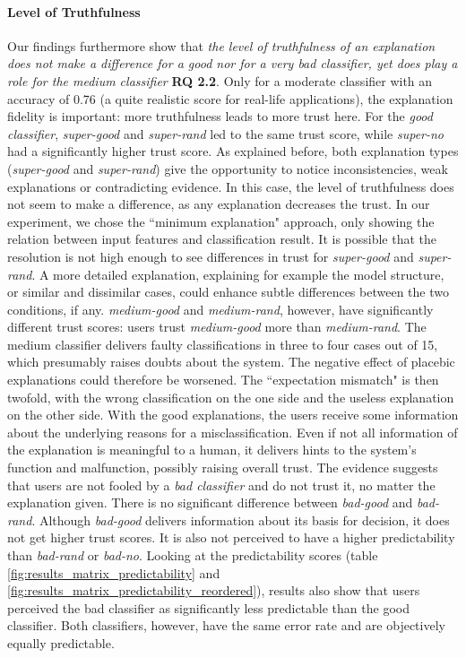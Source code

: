 \paragraph{Level of Truthfulness} 
Our findings furthermore show that \textit{the level of truthfulness of an explanation does not make a difference for a good nor for a very bad classifier, yet does play a role for the medium classifier} \textbf{RQ 2.2}. Only for a moderate classifier with an accuracy of 0.76 (a quite realistic score for real-life applications), the explanation fidelity is important: more truthfulness leads to more trust here.\newline
For the \textit{good classifier}, \textit{super-good} and \textit{super-rand} led to the same trust score, while \textit{super-no} had a significantly higher trust score. As explained before, both explanation types (\textit{super-good} and \textit{super-rand}) give the opportunity to notice inconsistencies, weak explanations or contradicting evidence. In this case, the level of truthfulness does not seem to make a difference, as any explanation decreases the trust. In our experiment, we chose the ``minimum explanation" approach, only showing the relation between input features and classification result. It is possible that the resolution is not high enough to see differences in trust for \textit{super-good} and \textit{super-rand}. A more detailed explanation, explaining for example the model structure, or similar and dissimilar cases, could enhance subtle differences between the two conditions, if any.\newline
\textit{medium-good} and \textit{medium-rand}, however, have significantly different trust scores: users trust \textit{medium-good} more than \textit{medium-rand}. The medium classifier delivers faulty classifications in three to four cases out of 15, which presumably raises doubts about the system. The negative effect of placebic explanations could therefore be worsened. The ``expectation mismatch" is then twofold, with the wrong classification on the one side and the useless explanation on the other side. With the good explanations, the users receive some information about the underlying reasons for a misclassification. Even if not all information of the explanation is meaningful to a human, it delivers hints to the system's function and malfunction, possibly raising overall trust.\newline
The evidence suggests that users are not fooled by a \textit{bad classifier} and do not trust it, no matter the explanation given. There is no significant difference between \textit{bad-good} and \textit{bad-rand}. Although \textit{bad-good} delivers information about its basis for decision, it does not get higher trust scores. It is also not perceived to have a higher predictability than \textit{bad-rand} or \textit{bad-no}. Looking at the predictability scores (table \ref{fig:results_matrix_predictability} and \ref{fig:results_matrix_predictability_reordered}), results also show that users perceived the bad classifier as significantly less predictable than the good classifier. Both classifiers, however, have the same error rate and are objectively equally predictable.\newline

